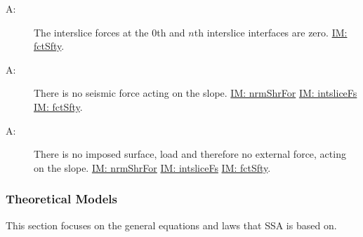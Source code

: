 \documentclass[12pt]{article}
\newcounter{assumpnum}
\newcommand{\atheassumpnum}{A\theassumpnum}
\begin{document}
\begin{description}
\item[\atheassumpnum\label{A:Edge-Slices}:]The interslice forces at the 0th and $n$th interslice interfaces are zero. \hyperref[IM:fctSfty]{IM: fctSfty}.
\end{description}
\begin{description}
\item[\atheassumpnum\label{A:Seismic-Force}:]There is no seismic force acting on the slope. \hyperref[IM:nrmShrFor]{IM: nrmShrFor} \hyperref[IM:intsliceFs]{IM: intsliceFs} \hyperref[IM:fctSfty]{IM: fctSfty}.
\end{description}
\begin{description}
\item[\atheassumpnum\label{A:Surface-Load}:]There is no imposed surface, load and therefore no external force, acting on the slope. \hyperref[IM:nrmShrFor]{IM: nrmShrFor} \hyperref[IM:intsliceFs]{IM: intsliceFs} \hyperref[IM:fctSfty]{IM: fctSfty}.
\end{description}
\subsubsection{Theoretical Models}
\label{Sec:TMs}
This section focuses on the general equations and laws that SSA is based on.
\par~
\end{document}
